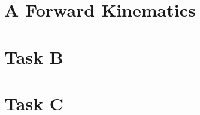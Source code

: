 
\newcommand\shortauthor{Maxim, Karim, Bryan}
\newcommand\shorttitle{Assignment 2}




\section{A  Forward Kinematics}
    \label{chapter:TaskA}
    

\newpage
\section{Task B}
    \label{chapter:TaskB}
    

\newpage
\section{Task C}
    \label{chapter:TaskC}
    

%
%



